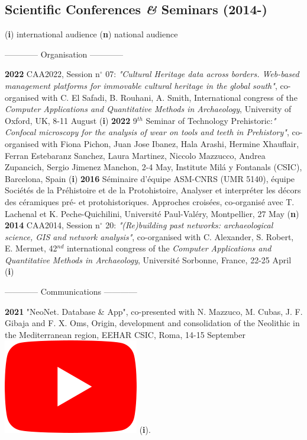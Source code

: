 \documentclass{article}
\begin{document}
\subsection*{Scientific Conferences \textit{\&} Seminars (2014-)}
\begin{center}(\textbf{i}) international audience {\textbar} (\textbf{n}) national audience \end{center}
\smallbreak
\begin{center}------------ Organisation ------------\end{center}
\smallbreak
\textbf{2022 }CAA2022, Session n$\mathrm{{}^\circ}$ 07: \textit{"Cultural Heritage data across borders. Web-based management platforms for immovable cultural heritage in the global south"}, co-organised with C. El Safadi, B. Rouhani, A. Smith, International congress of the \textit{Computer Applications and Quantitative Methods in Archaeology}, University of Oxford, UK, 8-11 August (\textbf{i})
\smallbreak
\textbf{2022 }9${}^{th}$ Seminar of Technology Prehistoric:\textit{" Confocal microscopy for the analysis of wear on tools and teeth in Prehistory"}, co-organised with Fiona Pichon, Juan Jose Ibanez, Hala Arashi, Hermine Xhauflair, Ferran Estebaranz Sanchez, Laura Martinez, Niccolo Mazzucco, Andrea Zupancich, Sergio Jimenez Manchon, 2-4 May, Institute Milá y Fontanals (CSIC), Barcelona, Spain (\textbf{i})
\smallbreak
\textbf{2016 }S\'{e}minaire d'\'{e}quipe ASM-CNRS (UMR 5140), \'{e}quipe Soci\'{e}t\'{e}s de la Pr\'{e}histoire et de la Protohistoire, Analyser et interpr\'{e}ter les d\'{e}cors des c\'{e}ramiques pr\'{e}- et protohistoriques. Approches crois\'{e}es, co-organis\'{e} avec T. Lachenal et K. Peche-Quichilini, Universit\'{e} Paul-Val\'{e}ry, Montpellier, 27 May (\textbf{n})
\smallbreak
\textbf{2014 }CAA2014, Session n$\mathrm{{}^\circ}$ 20: \textit{"(Re)building past networks: archaeological science, GIS and network analysis"}, co-organised with C. Alexander, S. Robert, E. Mermet, 42${}^{nd}$ international congress of the \textit{Computer Applications and Quantitative Methods in Archaeology}, Universit\'{e} Sorbonne, France, 22-25 April (\textbf{i})
\bigbreak
\begin{center}------------ Communications ------------\end{center}
\smallbreak
\textbf{2021 }"NeoNet. Database \& App", co-presented with N. Mazzuco, M. Cubas, J. F. Gibaja and F. X. Oms, Origin, development and consolidation of the Neolithic in the Mediterranean region, EEHAR CSIC, Roma, 14-15 September \href{https://youtu.be/GM2niot0XwE?t=10700}{\includegraphics[scale=0.2]{icon_youtube}} (\textbf{i}).
\end{document}
